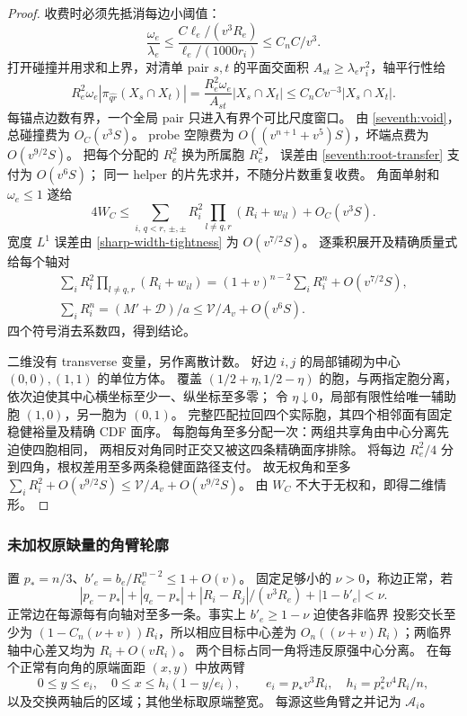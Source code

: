 \begin{proof}
收费时必须先抵消每边小阈值：
\begin{equation}\label{seventh:threshold-cancel}
 \frac{\omega_e}{\lambda_e}
 \le\frac{C\ell_e/(v^3R_e)}{\ell_e/(1000r_i)}
 \le C_nC/v^3.
\end{equation}
打开碰撞并用求和上界，对清单 pair \(s,t\) 的平面交面积
\(A_{st}\ge\lambda_er_i^2\)，轴平行性给
\[
 R_e^2\omega_e|\pi_{\widehat{qr}}(X_s\cap X_t)|
 =\frac{R_e^2\omega_e}{A_{st}}|X_s\cap X_t|
 \le C_nC v^{-3}|X_s\cap X_t|.
\]
每锚点边数有界，一个全局 pair 只进入有界个可比尺度窗口。
由 \eqref{seventh:void}，总碰撞费为 \(O_C(v^3S)\)。
probe 空隙费为 \(O((v^{n+1}+v^5)S)\)，坏端点费为 \(O(v^{9/2}S)\)。
把每个分配的 \(R_e^2\) 换为所属胞 \(R_c^2\)，
误差由 \eqref{seventh:root-transfer} 支付为 \(O(v^6S)\)；
同一 helper 的片先求并，不随分片数重复收费。
角面单射和 \(\omega_e\le1\) 遂给
\[
 4W_C\le\sum_{i,\,q<r,\,\pm,\pm}
 R_i^2\prod_{l\ne q,r}(R_i+w_{il})+O_C(v^3S).
\]
宽度 \(L^1\) 误差由 \eqref{sharp-width-tightness} 为 \(O(v^{7/2}S)\)。
逐乘积展开及精确质量式给每个轴对
\[
 \begin{gathered}
 \sum_iR_i^2\prod_{l\ne q,r}(R_i+w_{il})
 =(1+v)^{n-2}\sum_iR_i^n+O(v^{7/2}S),\\
 \sum_iR_i^n=(M'+\mathcal D)/a\le\mathcal V/A_v+O(v^6S).
 \end{gathered}
\]
四个符号消去系数四，得到结论。

二维没有 transverse 变量，另作离散计数。
好边 \(i,j\) 的局部铺砌为中心 \((0,0),(1,1)\) 的单位方体。
覆盖 \((1/2+\eta,1/2-\eta)\) 的胞，与两指定胞分离，
依次迫使其中心横坐标至少一、纵坐标至多零；
令 \(\eta\downarrow0\)，局部有限性给唯一辅助胞 \((1,0)\)，另一胞为 \((0,1)\)。
完整匹配拉回四个实际胞，其四个相邻面有固定稳健裕量及精确 CDF 面序。
每胞每角至多分配一次：两组共享角由中心分离先迫使四胞相同，
两相反对角同时正交又被这四条精确面序排除。
将每边 \(R_e^2/4\) 分到四角，根权差用至多两条稳健面路径支付。
故无权角和至多 \(\sum_iR_i^2+O(v^{9/2}S)\le\mathcal V/A_v+O(v^{9/2}S)\)。
由 \(W_C\) 不大于无权和，即得二维情形。
\end{proof}

\subsubsection{未加权原缺量的角臂轮廓}

置 \(p_*=n/3\)、\(b'_e=b_e/R_e^{n-2}\le1+O(v)\)。
固定足够小的 \(\nu>0\)，称边正常，若
\[
 |p_e-p_*|+|q_e-p_*|+
 |R_i-R_j|/(v^3R_e)+|1-b'_e|<\nu.
\]
正常边在每源每有向轴对至多一条。事实上 \(b'_e\ge1-\nu\) 迫使各非临界
投影交长至少为 \((1-C_n(\nu+v))R_i\)，所以相应目标中心差为
\(O_n((\nu+v)R_i)\)；两临界轴中心差又均为 \(R_i+O(vR_i)\)。
两个目标占同一角将违反原强中心分离。
在每个正常有向角的原端面距 \((x,y)\) 中放两臂
\begin{equation}\label{seventh:arms}
 0\le y\le e_i,\quad 0\le x\le h_i(1-y/e_i),\qquad
 e_i=p_*v^3R_i,\quad h_i=p_*^2v^4R_i/n,
\end{equation}
以及交换两轴后的区域；其他坐标取原端整宽。
每源这些角臂之并记为 \(\mathcal A_i\)。

